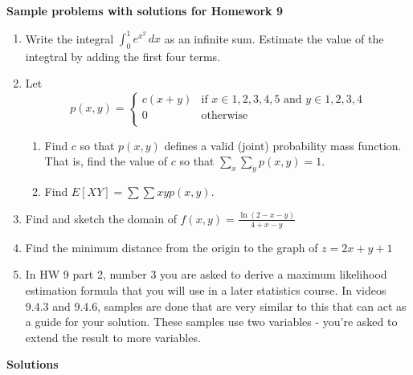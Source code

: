 \documentclass{article}
\begin{document}
\begin{center}
\textbf{
    Sample problems with solutions for Homework 9}
\end{center}
    \begin{enumerate}
        \item Write the integral $\int_0^1 e^{x^2}\,dx$ as an infinite sum. Estimate the value of the integtral by adding the first four terms.
        \item Let  $$p(x,y) = \begin{cases} 
                        c(x+y) & \text{if $x\in {1, 2, 3, 4, 5}$ and $y\in{1, 2,3,4}$} \\
                        0 & \text{otherwise} \\
                        \end{cases}
                        $$
                        \begin{enumerate}
                            \item 
         Find $c$ so that $p(x,y)$ defines a valid (joint) probability mass function.  That is, find the value of $c$ so that $\displaystyle \sum_x \sum_y p(x, y) = 1$. 
                            \item Find $\displaystyle E[XY] =\sum\sum xyp(x,y)$.
                        \end{enumerate}
                            \item Find and sketch the domain of $f\left(x,y\right)=\frac{\ln(2-x-y)}{4+x-y}$
                            \item Find the minimum distance from the origin to the graph of $z=2x+y+1$ 
                            \item In HW 9 part 2, number 3 you are asked to derive a maximum likelihood estimation formula that you will use in a later statistics course. In videos 9.4.3 and 9.4.6, samples are done that are very similar to this that can act as a guide for your solution. These samples use two variables - you're asked to extend the result to more variables.
    \end{enumerate}
    \begin{center}
        \textbf{\Large{Solutions}}
    \end{center}
\end{document}
